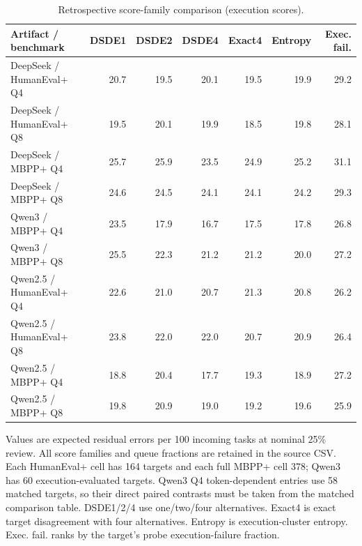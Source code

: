 \begin{table}[htbp]
\centering
\caption{Retrospective score-family comparison (execution scores).}
\label{tab:scores-retrospective-1}
\footnotesize
\begin{tabular}{lrrrrrr}
\toprule
Artifact / benchmark & DSDE1 & DSDE2 & DSDE4 & Exact4 & Entropy & Exec. fail. \\
\midrule
DeepSeek / HumanEval+ Q4 & 20.7 & 19.5 & 20.1 & 19.5 & 19.9 & 29.2 \\
DeepSeek / HumanEval+ Q8 & 19.5 & 20.1 & 19.9 & 18.5 & 19.8 & 28.1 \\
DeepSeek / MBPP+ Q4 & 25.7 & 25.9 & 23.5 & 24.9 & 25.2 & 31.1 \\
DeepSeek / MBPP+ Q8 & 24.6 & 24.5 & 24.1 & 24.1 & 24.2 & 29.3 \\
Qwen3 / MBPP+ Q4 & 23.5 & 17.9 & 16.7 & 17.5 & 17.8 & 26.8 \\
Qwen3 / MBPP+ Q8 & 25.5 & 22.3 & 21.2 & 21.2 & 20.0 & 27.2 \\
Qwen2.5 / HumanEval+ Q4 & 22.6 & 21.0 & 20.7 & 21.3 & 20.8 & 26.2 \\
Qwen2.5 / HumanEval+ Q8 & 23.8 & 22.0 & 22.0 & 20.7 & 20.9 & 26.4 \\
Qwen2.5 / MBPP+ Q4 & 18.8 & 20.4 & 17.7 & 19.3 & 18.9 & 27.2 \\
Qwen2.5 / MBPP+ Q8 & 19.8 & 20.9 & 19.0 & 19.2 & 19.6 & 25.9 \\
\bottomrule
\end{tabular}
\par\vspace{4pt}\begin{minipage}{0.98\linewidth}\footnotesize Values are expected residual errors per 100 incoming tasks at nominal 25\% review. All score families and queue fractions are retained in the source CSV. Each HumanEval+ cell has 164 targets and each full MBPP+ cell 378; Qwen3 has 60 execution-evaluated targets. Qwen3 Q4 token-dependent entries use 58 matched targets, so their direct paired contrasts must be taken from the matched comparison table. DSDE1/2/4 use one/two/four alternatives. Exact4 is exact target disagreement with four alternatives. Entropy is execution-cluster entropy. Exec. fail. ranks by the target's probe execution-failure fraction.\end{minipage}
\end{table}

